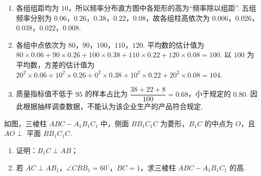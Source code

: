 \begin{solution}
\begin{enumerate}
\item 各组组距均为 \(10\)，所以频率分布直方图中各矩形的高为“频率除以组距”. 五组频率分别为 \(0.06\)，\(0.26\)，\(0.38\)，\(0.22\)，\(0.08\)，故各组柱高依次为 \(0.006\)，\(0.026\)，\(0.038\)，\(0.022\)，\(0.008\).
\item 各组中点依次为 \(80\)，\(90\)，\(100\)，\(110\)，\(120\). 平均数的估计值为 \(80\times0.06+90\times0.26+100\times0.38+110\times0.22+120\times0.08=100\). 以 \(100\) 为平均数，方差的估计值为 \(20^2\times0.06+10^2\times0.26+0^2\times0.38+10^2\times0.22+20^2\times0.08=104\).
\item 质量指标值不低于 \(95\) 的样本占比为 \(\dfrac{38+22+8}{100}=0.68\)，小于规定的 \(0.80\). 因此根据抽样调查数据，不能认为该企业生产的产品符合规定.
\end{enumerate}
\end{solution}

\begin{problem}
如图，三棱柱 \(ABC - A_{1}B_{1}C_{1}\) 中，侧面 \(BB_{1}C_{1}C\) 为菱形，\(B_{1}C\) 的中点为 \(O\)，且 \(AO \perp\) 平面 \(BB_{1}C_{1}C\).

\begin{enumerate}
\item 证明：\(B_{1}C \perp AB\)；
\item 若 \(AC \perp AB_{1}\)，\(\angle CBB_{1} = 60^{\circ}\)，\(BC = 1\)，求三棱柱 \(ABC - A_{1}B_{1}C_{1}\) 的高.
\end{enumerate}

\FloatBarrier
\end{problem}

